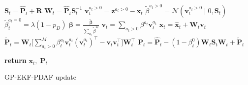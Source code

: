 \begin{algorithm}[h]
    \begin{algorithmic}[1]
        \State $\boldsymbol{S}_t = \hat{\boldsymbol{P}}_t + \boldsymbol{R}$ 
        \State $\boldsymbol{W}_t = \hat{\boldsymbol{P}}_t \boldsymbol{S}_t^{-1}$
        \State $\boldsymbol{v}_t^{a_t>0} = \boldsymbol{z}^{a_t>0} - \hat{\boldsymbol{x}}_t$ 
        \State $\tilde{\beta}^{a_t>0} = \mathcal{N}(\boldsymbol{v}_t^{a_t > 0} \; | \; 0, \boldsymbol{S}_t)$ 
        \EndFor
        \State $\tilde{\beta}_t^{a_t = 0} = \lambda (1-p_D)$ 
        \State $\boldsymbol{\beta} = \frac{\tilde{\boldsymbol{\beta}}}{\sum_{a_t} \tilde{\beta}^{a_t}}$ 
        \State $\boldsymbol{v}_t = \sum_{a_t > 0} \beta^{a_t} \boldsymbol{v}_t^{a_t}$
        \State $\boldsymbol{x}_t = \hat{\boldsymbol{x}}_t + \boldsymbol{W}_t \boldsymbol{v}_t$
        \State $\tilde{\boldsymbol{P}}_t = \boldsymbol{W}_t \big[\sum_{a_t > 0}^M \beta_t^{a_t} \boldsymbol{v}_t^{a_t} (\boldsymbol{v}_t^{a_t})^\intercal - \boldsymbol{v}_t \boldsymbol{v}_t^\intercal \big] \boldsymbol{W}_t^\intercal$
        \State $\boldsymbol{P}_t = \hat{\boldsymbol{P}}_t - (1 - \beta_t^{0}) \boldsymbol{W}_t \boldsymbol{S}_t  \boldsymbol{W}_t + \tilde{\boldsymbol{P}}_t$ 


        \State \textbf{return} $\boldsymbol{x}_t, \; \boldsymbol{P}_t$
        \EndProcedure
    \end{algorithmic}
    \caption{GP-EKF-PDAF update}
    \label{alg:gp_ekf_pdaf}
\end{algorithm}


